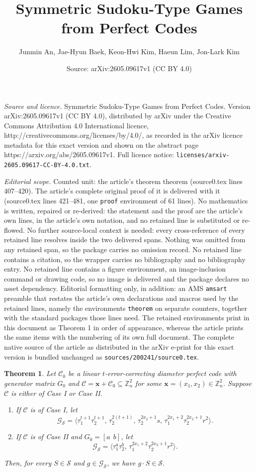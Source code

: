 \documentclass[10pt,a4paper]{amsart}
\title{Symmetric Sudoku-Type Games from Perfect Codes}
\author{Junmin An, Jae-Hyun Baek, Keon-Hwi Kim, Haeun Lim, Jon-Lark Kim}
\date{Source: arXiv:2605.09617v1 (CC BY 4.0)}
\newtheorem{theorem}{Theorem}
\begin{document}
\maketitle

\noindent\emph{Source and licence.} Symmetric Sudoku-Type Games from Perfect Codes. Version arXiv:2605.09617v1 (CC BY 4.0), distributed by arXiv under the Creative Commons Attribution 4.0 International licence, http://creativecommons.org/licenses/by/4.0/, as recorded in the arXiv licence metadata for this exact version and shown on the abstract page https://arxiv.org/abs/2605.09617v1. Full licence notice: \texttt{licenses/arxiv-2605.09617-CC-BY-4.0.txt}.\par\smallskip

\noindent\textit{Editorial scope.} Counted unit: the article's theorem theorem (source0.tex lines 407--420). The article's complete original proof of it is delivered with it (source0.tex lines 421--481, one \texttt{proof} environment of 61 lines). No mathematics is written, repaired or re-derived: the statement and the proof are the article's own lines, in the article's own notation, and no retained line is substituted or re-flowed.  No further source-local context is needed: every cross-reference of every retained line resolves inside the two delivered spans.  Nothing was omitted from any retained span, so the package carries no omission record.  No retained line contains a citation, so the wrapper carries no bibliography and no bibliography entry.  No retained line contains a figure environment, an image-inclusion command or drawing code, so no image is delivered and the package declares no asset dependency.  Editorial formatting only, in addition: an AMS \texttt{amsart} preamble that restates the article's own declarations and macros used by the retained lines, namely the environments \texttt{theorem} on separate counters, together with the standard packages those lines need.  The retained environments print in this document as Theorem 1 in order of appearance, whereas the article prints the same items with the numbering of its own full document.  The complete native source of the article as distributed in the arXiv e-print for this exact version is bundled unchanged as \texttt{sources/200241/source0.tex}.
\begin{theorem}
Let $\mathcal{C}_0$ be a linear $t$-error-correcting diameter perfect code with generator matrix $G_0$ and $\mathcal{C}=\mathbf{x}+\mathcal{C}_0\subseteq\mathbb{Z}_n^2$ for some $\mathbf{x}=(x_1, x_2)\in\mathbb{Z}_n^2$. Suppose $\mathcal{C}$ is either of Case I or Case II.
	\begin{enumerate}
	\item[(i)] If $\mathcal{C}$ is of Case I, let
	\[
	\mathcal{G}_\mathcal{S}=\langle \tau_1^{t+1}\tau_2^{t+1},\, \tau_2^{2(t+1)},\,\tau_2^{2x_2+1}s,\, \tau_1^{2x_1+2}\tau_2^{2x_2+1}r^2\rangle.
	\]
	\item[(ii)] If $\mathcal{C}$ is of Case II and $G_0=[a~~b]$, let
	\[
	\mathcal{G}_\mathcal{S}=\langle \tau_1^{a}\tau_2^{b},\, \tau_1^{2x_1+2}\tau_2^{2x_2+1}r^2\rangle.
	\]
	\end{enumerate}
	Then, for every $S\in \mathcal{S}$ and $g\in \mathcal{G}_\mathcal{S}$, we have $g\cdot S\in \mathcal{S}$.
\end{theorem}
\end{document}
